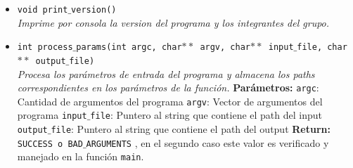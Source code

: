 \documentclass[a4paper, 10pt]{article}
\def\code#1{\texttt{#1}}
\begin{document}
\begin{itemize}
				\item \code{void print$\_$version()}
				\\\textit{Imprime por consola la version del programa y los integrantes del grupo.}

				\item \code{int process$\_$params(int argc, char$**$ argv,
				char$**$ input$\_$file, char$**$ output$\_$file)}
				\\\textit{Procesa los parámetros de entrada del programa y almacena
				los paths correspondientes en los parámetros de la función.}
					\subitem \textbf{Parámetros:}
						\subsubitem \code{argc}: Cantidad de argumentos del programa
						\subsubitem \code{argv}: Vector de argumentos del programa
						\subsubitem \code{input$\_$file}: Puntero al string que contiene el path
						del input
						\subsubitem \code{output$\_$file}: Puntero al string que contiene el path
						del output
					\subitem \textbf{Return:}
						\subsubitem \code{SUCCESS o BAD$\_$ARGUMENTS} , en el segundo caso este valor
						es verificado y manejado en la función \code{main}.
						
			\end{itemize}
			
\end{document}
